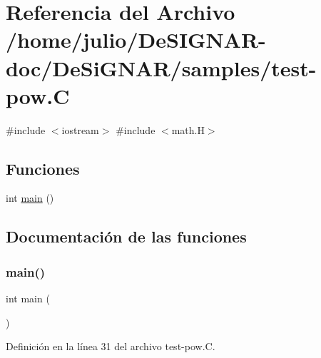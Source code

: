 \hypertarget{test-pow_8_c}{}\section{Referencia del Archivo /home/julio/\+De\+S\+I\+G\+N\+A\+R-\/doc/\+De\+Si\+G\+N\+A\+R/samples/test-\/pow.C}
\label{test-pow_8_c}
{\ttfamily \#include $<$iostream$>$}\newline
{\ttfamily \#include $<$math.\+H$>$}\newline
\subsection*{Funciones}
\begin{DoxyCompactItemize}
\item 
int \hyperlink{test-pow_8_c_ae66f6b31b5ad750f1fe042a706a4e3d4}{main} ()
\end{DoxyCompactItemize}


\subsection{Documentación de las funciones}
\mbox{\label{test-pow_8_c_ae66f6b31b5ad750f1fe042a706a4e3d4}} 
\subsubsection{\texorpdfstring{main()}{main()}}
{\footnotesize\ttfamily int main (\begin{DoxyParamCaption}{ }\end{DoxyParamCaption})}



Definición en la línea 31 del archivo test-\/pow.\+C.

